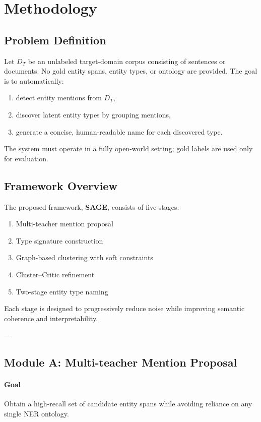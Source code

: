 \documentclass[14pt]{extreport}
\begin{document}
\section{Methodology}

\subsection{Problem Definition}
Let $D_T$ be an unlabeled target-domain corpus consisting of sentences or documents.
No gold entity spans, entity types, or ontology are provided.
The goal is to automatically:
\begin{enumerate}
    \item detect entity mentions from $D_T$,
    \item discover latent entity types by grouping mentions,
    \item generate a concise, human-readable name for each discovered type.
\end{enumerate}

The system must operate in a fully open-world setting; gold labels are used only for evaluation.

\subsection{Framework Overview}
The proposed framework, \textbf{SAGE}, consists of five stages:
\begin{enumerate}
    \item Multi-teacher mention proposal
    \item Type signature construction
    \item Graph-based clustering with soft constraints
    \item Cluster--Critic refinement
    \item Two-stage entity type naming
\end{enumerate}

Each stage is designed to progressively reduce noise while improving semantic coherence and interpretability.

---

\subsection{Module A: Multi-teacher Mention Proposal}

\paragraph{Goal}
Obtain a high-recall set of candidate entity spans while avoiding reliance on any single NER ontology.
\end{document}
